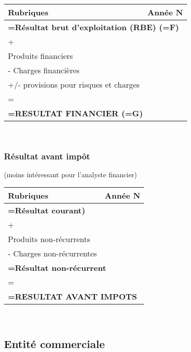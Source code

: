 \documentclass{article}
\begin{document}
\begin{center}
\begin{tabular}{|l|c|}
    \hline
    \textbf{Rubriques} & \textbf{Année N}\\
    \hline
    \multicolumn{2}{|l|}{\textbf{=Résultat brut d'exploitation (RBE)  (=F)}}   \\
    \hline
    \multicolumn{2}{l}{ + }\\
    \hline
    Produits financiers &\\
    - Charges financières & \\
    +/- provisions pour risques et charges & \\
    \hline
    \multicolumn{2}{l}{ = }\\
    \hline
    \multicolumn{2}{|l|}{\textbf{=RESULTAT FINANCIER (=G)}}   \\
    \hline
\end{tabular}
\end{center}
\\

\subsubsection*{Résultat avant impôt}
(moins intéressant pour l’analyste financier)

\begin{center}
\begin{tabular}{|l|c|}
    \hline
    \textbf{Rubriques} & \textbf{Année N}\\
    \hline
    \multicolumn{2}{|l|}{\textbf{=Résultat courant)}}   \\
    \hline
    \multicolumn{2}{l}{ + }\\
    \hline
    Produits non-récurrents &\\
    - Charges non-récurrentes & \\
    \hline
    \multicolumn{2}{|l|}{\textbf{=Résultat non-récurrent}}   \\
    \hline
    \multicolumn{2}{l}{ = }\\
    \hline
    \multicolumn{2}{|l|}{\textbf{=RESULTAT AVANT IMPOTS}}   \\
    \hline
\end{tabular}
\end{center}
\\

\subsection{Entité commerciale}
\end{document}
